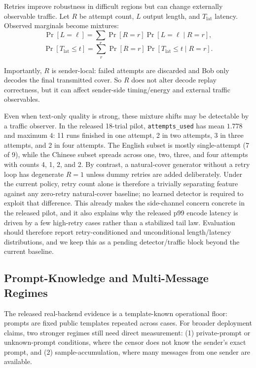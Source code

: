 Retries improve robustness in difficult regions but can change externally observable traffic.
Let $R$ be attempt count, $L$ output length, and $T_{\mathrm{lat}}$ latency.
Observed marginals become mixtures:
\begin{equation}
\Pr[L=\ell]=\sum_r \Pr[R=r]\Pr[L=\ell\mid R=r],
\end{equation}
\begin{equation}
\Pr[T_{\mathrm{lat}}\le t]=\sum_r \Pr[R=r]\Pr[T_{\mathrm{lat}}\le t\mid R=r].
\end{equation}

Importantly, $R$ is sender-local: failed attempts are discarded and Bob only decodes the final transmitted cover. So $R$ does not alter decode replay correctness, but it can affect sender-side timing/energy and external traffic observables.

Even when text-only quality is strong, these mixture shifts may be detectable by a traffic observer. In the released 18-trial pilot, \texttt{attempts\_used} has mean $1.778$ and maximum $4$: 11 runs finished in one attempt, 2 in two attempts, 3 in three attempts, and 2 in four attempts. The English subset is mostly single-attempt (7 of 9), while the Chinese subset spreads across one, two, three, and four attempts with counts 4, 1, 2, and 2. By contrast, a natural-cover generator without a retry loop has degenerate $R=1$ unless dummy retries are added deliberately. Under the current policy, retry count alone is therefore a trivially separating feature against any zero-retry natural-cover baseline; no learned detector is required to exploit that difference. This already makes the side-channel concern concrete in the released pilot, and it also explains why the released p99 encode latency is driven by a few high-retry cases rather than a stabilized tail law. Evaluation should therefore report retry-conditioned and unconditional length/latency distributions, and we keep this as a pending detector/traffic block beyond the current baseline.

\subsection{Prompt-Knowledge and Multi-Message Regimes}

The released real-backend evidence is a template-known operational floor: prompts are fixed public templates repeated across cases. For broader deployment claims, two stronger regimes still need direct measurement:
(1) private-prompt or unknown-prompt conditions, where the censor does not know the sender's exact prompt,
and (2) sample-accumulation, where many messages from one sender are available.


